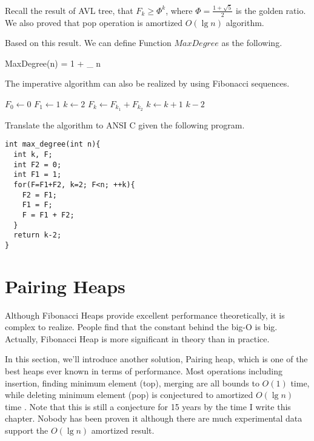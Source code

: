 \documentclass{article}
\begin{document}
Recall the result of AVL tree, that $F_k \geq \Phi^k$, where
$\Phi = \frac{1+\sqrt{5}}{2}$ is the golden ratio. We also proved
that pop operation is amortized $O(\lg n)$ algorithm.

Based on this result. We can define Function $MaxDegree$ as the following.

\be
  MaxDegree(n) = 1 + \lfloor \log_{\Phi} n \rfloor
\ee

The imperative  algorithm can also be realized by
using Fibonacci sequences.

\begin{algorithmic}[1]
  \State $F_0 \gets 0$
  \State $F_1 \gets 1$
  \State $k \gets 2$
  \Repeat
    \State $F_k \gets F_{k_1} + F_{k_2}$
    \State $k \gets k+1$
  \State \Return $k-2$
\EndFunction
\end{algorithmic}

Translate the algorithm to ANSI C given the following program.

\lstset{language=C}
\begin{lstlisting}
int max_degree(int n){
  int k, F;
  int F2 = 0;
  int F1 = 1;
  for(F=F1+F2, k=2; F<n; ++k){
    F2 = F1;
    F1 = F;
    F = F1 + F2;
  }
  return k-2;
}
\end{lstlisting}


\section{Pairing Heaps}
\label{pairing-heap} 
Although Fibonacci Heaps provide excellent performance theoretically,
it is complex to realize. People find that the constant behind the
big-O is big. Actually, Fibonacci Heap is more significant in theory
than in practice.

In this section, we'll introduce another solution, Pairing heap,
which is one of the best heaps ever known in terms of performance.
Most operations including insertion, finding minimum element (top),
merging are all bounds to $O(1)$ time, while deleting minimum element (pop)
is conjectured to amortized $O(\lg n)$ time \cite{pairing-heap}
\cite{okasaki-book}. Note that this is still
a conjecture for 15 years by the time I write this chapter. Nobody has been
proven it although there are much experimental data support the
$O(\lg n)$ amortized result.
\end{document}
